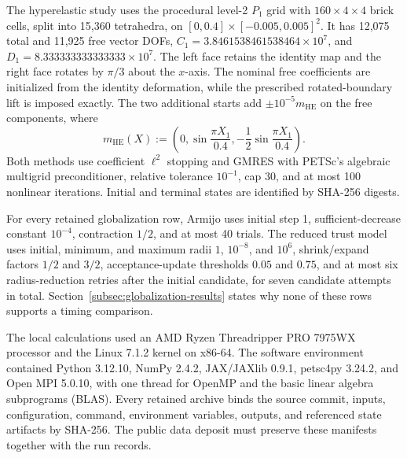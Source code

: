 The hyperelastic study uses the procedural level-2 $P_1$ grid with
$160\times4\times4$ brick cells, split into 15,360 tetrahedra, on
$[0,0.4]\times[-0.005,0.005]^2$. It has 12,075 total and 11,925 free vector
DOFs, $C_1=3.8461538461538464\times10^7$, and
$D_1=8.333333333333333\times10^7$. The left face retains the identity map and
the right face rotates by $\pi/3$ about the $x$-axis. The nominal free
coefficients are initialized from the identity deformation, while the
prescribed rotated-boundary lift is imposed exactly. The two additional starts add
$\pm10^{-5}m_{\mathrm{HE}}$ on the free components, where
\begin{equation}
  m_{\mathrm{HE}}(X)
  :=\left(0,\sin\!\frac{\pi X_1}{0.4},
            -\frac12\sin\!\frac{\pi X_1}{0.4}\right).
  \label{eq:he-globalization-perturbation}
\end{equation}
Both methods use coefficient $\ell^2$ stopping and GMRES with PETSc's
algebraic multigrid preconditioner, relative tolerance $10^{-1}$, cap 30, and
at most 100 nonlinear iterations. Initial and terminal states are identified
by SHA-256 digests.

For every retained globalization row, Armijo uses initial step 1,
sufficient-decrease constant $10^{-4}$, contraction $1/2$, and at most 40
trials. The reduced trust model uses initial, minimum, and maximum radii $1$,
$10^{-8}$, and $10^6$, shrink/expand factors $1/2$ and $3/2$,
acceptance-update thresholds $0.05$ and $0.75$, and at most six
radius-reduction retries after the initial candidate, for seven candidate
attempts in total. Section~\ref{subsec:globalization-results}
states why none of these rows supports a timing comparison.

The local calculations used an AMD Ryzen Threadripper PRO 7975WX processor and
the Linux 7.1.2 kernel on x86-64. The software environment contained Python 3.12.10, NumPy
2.4.2, JAX/JAXlib 0.9.1, petsc4py 3.24.2, and Open MPI 5.0.10, with one thread
for OpenMP and the basic linear algebra subprograms (BLAS). Every retained
archive binds the source commit, inputs, configuration, command, environment
variables, outputs, and referenced state artifacts by SHA-256. The public data
deposit must preserve these manifests together with the run records.
